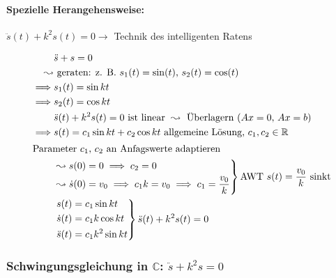 
\paragraph{Spezielle Herangehensweise:} $\ddot s(t) + k^2s(t) = 0 \rightarrow$ Technik des intelligenten Ratens

\begin{example}[für $k = 1$]
\begin{align*}
	& \ddot s + s = 0 \\
	\leadsto &\text{ geraten: z. B. $s_1(t) = \sin(t)$, $s_2(t) = \cos(t)$}\\
	\implies &s_1(t) = \sin kt \\
	\implies &s_2(t) = \cos kt \\
	& \ddot s(t) + k^2s(t) = 0 \text { ist linear } \leadsto \text{ Überlagern ($Ax = 0$, $Ax = b$)} \\
	\implies &s(t) = c_1 \sin kt + c_2 \cos kt \text{ allgemeine Lösung, $c_1, c_2 \in \mathbb{R}$} \\
	\intertext{Parameter $c_1$, $c_2$ an Anfagswerte adaptieren}
	&\left. \begin{aligned}
		\leadsto s(0) &= 0 \implies c_2 = 0 \\
		\leadsto \dot s(0) &= v_0 \implies c_1k = v_0 \implies c_1 = \frac{v_0}{k}
	\end{aligned} \right\} \text {AWT $s(t) = \frac{v_0}{k}$ sinkt} \\
	&\left. \begin{aligned}
		s(t) &= c_1 \sin kt \\
		\dot s(t) &= c_1k \cos kt \\
		\ddot s(t) &= c_1k^2 \sin kt
	\end{aligned} \right\}\ddot s(t) + k^2s(t) = 0
\end{align*}
\end{example}

\subsubsection*{Schwingungsgleichung in $\mathbb{C}$: $\ddot s + k^2s = 0$}

